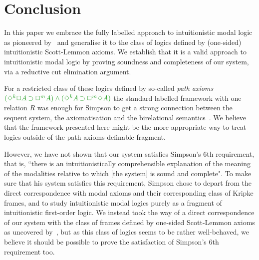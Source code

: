 \section{Conclusion}


In this paper we embrace the fully labelled approach to intuitionistic modal logic as pioneered by~\cite{maffezioli:etal:synthese13} and generalise it to the class of logics defined by (one-sided) intuitionistic Scott-Lemmon axioms.
%
We establish that it is a valid approach to intuitionistic modal logic by proving soundness and completeness of our system, via a reductive cut elimination argument.

For a restricted class of these logics defined by so-called \emph{path axioms} $\fm{(\DIA^k\BOX A \IMP\BOX^m A) \AND (\DIA^k A \IMP \BOX^m\DIA A)}$ the standard labelled framework with one relation $R$ was enough for Simpson to get a strong connection between the sequent system, the axiomatisation and the birelational semantics~\cite{simpson:phd}.
%
%
We believe that the framework presented here might be the more appropriate way to treat logics outside of the path axioms definable fragment.

However, we have not shown that our system satisfies Simpson's 6th requirement, that is, ``there is an intuitionistically comprehensible explanation of the meaning of the modalities relative to which [the system] is sound and complete".
%
To make sure that his system satisfies this requirement, Simpson chose to depart from the direct correspondence with modal axioms and their corresponding class of Kripke frames, and to study intuitionistic modal logics purely as a fragment of intuitionistic first-order logic.
%
We instead took the way of a direct correspondence of our system with the class of frames defined by one-sided Scott-Lemmon axioms as uncovered by~\cite{plotkin:stirling:86}, but as this class of logics seems to be rather well-behaved, we believe it should be possible to prove the satisfaction of Simpson's 6th requirement too.

